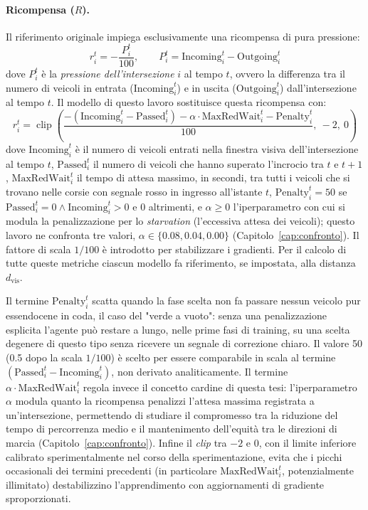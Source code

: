 \paragraph{Ricompensa ($R$).} Il riferimento originale impiega
esclusivamente una ricompensa di pura pressione:
\begin{equation}
  r_i^t = -\frac{P_i^t}{100}, \qquad P_i^t = \mathrm{Incoming}_i^t - \mathrm{Outgoing}_i^t
  \label{eq:reward-paper}
\end{equation}
dove $P_i^t$ è la \emph{pressione dell'intersezione} $i$ al tempo $t$, ovvero la differenza tra il numero di veicoli in entrata ($\mathrm{Incoming}_i^t$) e in uscita ($\mathrm{Outgoing}_i^t$) dall'intersezione al tempo $t$.
Il modello di questo lavoro sostituisce questa ricompensa con:
\begin{equation}
  r_i^t = \operatorname{clip}\!\left(
  \frac{-(\mathrm{Incoming}_i^t - \mathrm{Passed}_i^t) - \alpha \cdot \mathrm{MaxRedWait}_i^t - \mathrm{Penalty}_i^t}{100},\ -2,\ 0
  \right)
  \label{eq:reward-custom}
\end{equation}
dove
$\mathrm{Incoming}_i^t$ è il numero di veicoli entrati nella finestra visiva dell'intersezione al tempo $t$,
$\mathrm{Passed}_i^t$ il numero di veicoli che hanno superato l'incrocio tra $t$ e $t{+}1$,
$\mathrm{MaxRedWait}_i^t$ il tempo di attesa massimo, in secondi, tra tutti i veicoli che si trovano nelle corsie con segnale rosso in ingresso all'istante $t$,
$\mathrm{Penalty}_i^t = 50$ se $\mathrm{Passed}_i^t = 0 \land \mathrm{Incoming}_i^t > 0$ e $0$ altrimenti,
e $\alpha \geq 0$ l'iperparametro con cui si modula la penalizzazione per lo \emph{starvation} (l'eccessiva attesa dei veicoli); questo lavoro ne confronta tre valori, $\alpha \in \{0.08, 0.04, 0.00\}$ (Capitolo~\ref{cap:confronto}).
Il fattore di scala $1/100$ è introdotto per stabilizzare i gradienti.
Per il calcolo di tutte queste metriche ciascun modello fa riferimento, se impostata, alla distanza $d_{\text{vis}}$.

Il termine $\mathrm{Penalty}_i^t$ scatta quando la fase scelta non fa
passare nessun veicolo pur essendocene in coda, il caso del "verde a
vuoto": senza una penalizzazione esplicita l'agente può restare a lungo,
nelle prime fasi di training, su una scelta degenere di questo tipo senza
ricevere un segnale di correzione chiaro. Il valore 50 (0.5 dopo la
scala $1/100$) è scelto per essere comparabile in scala al termine
$(\mathrm{Passed}_i^t - \mathrm{Incoming}_i^t)$, non derivato
analiticamente. Il termine $\alpha \cdot \mathrm{MaxRedWait}_i^t$ regola
invece il concetto cardine di questa tesi: l'iperparametro $\alpha$
modula quanto la ricompensa penalizzi l'attesa massima registrata a
un'intersezione, permettendo di studiare il compromesso tra la riduzione
del tempo di percorrenza medio e il mantenimento dell'equità tra le
direzioni di marcia (Capitolo~\ref{cap:confronto}). Infine il \emph{clip}
tra $-2$ e $0$, con il limite inferiore calibrato sperimentalmente nel
corso della sperimentazione, evita che i picchi occasionali dei termini
precedenti (in particolare $\mathrm{MaxRedWait}_i^t$, potenzialmente
illimitato) destabilizzino l'apprendimento con aggiornamenti di gradiente
sproporzionati.

